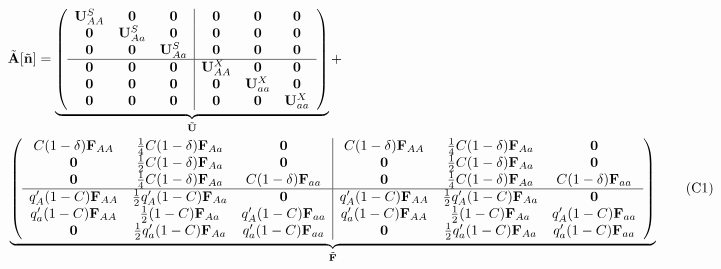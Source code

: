 \documentclass[11pt]{article}
\newcommand\numberthis{\addtocounter{equation}{1}\tag{\theequation}}
\def\mbf#1{\mathbf{#1}}
\begin{document}
{
\small

\begin{align*} \label{eq:AtildeFull}
	&\tilde{\mbf{A}}[\tilde{\mbf{n}}] = 
		 \underbrace{\left(
			\begin{array}{ccc|ccc}
				\mbf{U}^S_{AA} & \mbf{0} & \mbf{0} & \mbf{0} & \mbf{0} & \mbf{0} \\ 
				\mbf{0} & \mbf{U}^S_{Aa} & \mbf{0} & \mbf{0} & \mbf{0} & \mbf{0} \\
				\mbf{0} & \mbf{0} & \mbf{U}^S_{Aa} & \mbf{0} & \mbf{0} & \mbf{0} \\ \hline
				\mbf{0} & \mbf{0} & \mbf{0} & \mbf{U}^X_{AA} & \mbf{0} & \mbf{0} \\
				\mbf{0} & \mbf{0} & \mbf{0} & \mbf{0} & \mbf{U}^X_{aa} & \mbf{0}\\
				\mbf{0} & \mbf{0} & \mbf{0} & \mbf{0} & \mbf{0} & \mbf{U}^X_{aa}
			\end{array} \right)}_{\tilde{\mbf{U}}} + \\ 
	&\underbrace{\left(
			\begin{array}{ccc|ccc}
				C (1 - \delta) \mbf{F}_{AA} & \frac{1}{4} C (1 - \delta) \mbf{F}_{Aa} & \mbf{0} & C (1 - \delta) \mbf{F}_{AA} & \frac{1}{4} C (1 - \delta) \mbf{F}_{Aa} & \mbf{0} \\ 
				\mbf{0} & \frac{1}{2} C (1 - \delta) \mbf{F}_{Aa} & \mbf{0} & \mbf{0} & \frac{1}{2} C (1 - \delta) \mbf{F}_{Aa} & \mbf{0}  \\
				\mbf{0} & \frac{1}{4} C (1 - \delta) \mbf{F}_{Aa} & C (1 - \delta) \mbf{F}_{aa} & \mbf{0} & \frac{1}{4} C (1 - \delta) \mbf{F}_{Aa} & C (1 - \delta) \mbf{F}_{aa} \\ \hline
				q^{\prime}_{A} (1 - C)\mbf{F}_{AA} & \frac{1}{2} q^{\prime}_{A} (1 - C)\mbf{F}_{Aa}  & \mbf{0} & q^{\prime}_{A} (1 - C) \mbf{F}_{AA}& \frac{1}{2} q^{\prime}_{A} (1 - C) \mbf{F}_{Aa} & \mbf{0} \\
				q^{\prime}_{a} (1 - C) \mbf{F}_{AA} & \frac{1}{2} (1 - C)\mbf{F}_{Aa}  & q^{\prime}_{A} (1 - C)\mbf{F}_{aa}  & q^{\prime}_{a} (1 - C) \mbf{F}_{AA} & \frac{1}{2}(1 - C) \mbf{F}_{Aa}  & q^{\prime}_{A} (1 - C)\mbf{F}_{aa}  \\
				\mbf{0} & \frac{1}{2} q^{\prime}_{a} (1 - C)\mbf{F}_{Aa} & q^{\prime}_{a} (1 - C) \mbf{F}_{aa} & \mbf{0} & \frac{1}{2} q^{\prime}_{a} (1 - C)\mbf{F}_{Aa} & q^{\prime}_{a} (1 - C)\mbf{F}_{aa} 
			\end{array} \right)}_{\tilde{\mbf{F}}} \numberthis
\end{align*}

}
\end{document}
